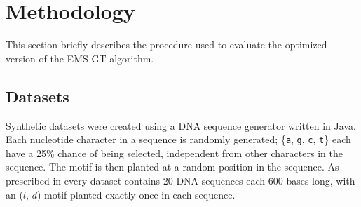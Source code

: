 \documentclass[oneside,12pt]{DISCSthesis}
\begin{document}
{		%


				

\chapter{Methodology}
	This section briefly describes the procedure used to evaluate the optimized version of the EMS-GT algorithm.

	\section{Datasets}
		Synthetic datasets were created using a DNA sequence generator written in Java. Each nucleotide character in a sequence is randomly generated; \{\texttt{a}, \texttt{g}, \texttt{c}, \texttt{t}\} each have a 25\% chance of being selected, independent from other characters in the sequence.
		The motif is then planted at a random position in the sequence. As prescribed in \cite{pevzner2000combinatorial} every dataset contains 20 DNA sequences each 600 bases long, with an ($l$, $d$) motif planted exactly once in each sequence.

}
\end{document}
